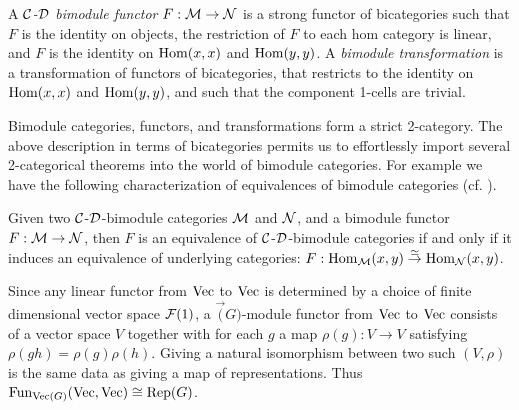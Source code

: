 \documentclass{amsart}
\begin{document}
\begin{definition}		
A {\em $\cC$-$\cD$ bimodule functor} $F:\cM \to \cN$ is a strong functor of bicategories such that 
		 $F$ is the identity on objects,
		  the restriction of $F$ to each hom category is linear,
		 and $F$ is the identity on $\Hom(x,x)$ and $\Hom(y,y)$.
	A {\em bimodule transformation} is a transformation of functors of bicategories, that restricts to the identity on $\Hom(x,x)$ and $\Hom(y,y)$, and such that the component 1-cells are trivial.  
\end{definition} %
	
%
\nid Bimodule categories, functors, and transformations form a strict 2-category.  %
 The above description in terms of bicategories permits us to effortlessly import several 2-categorical theorems into the world of bimodule categories. For example we have the following characterization of equivalences of bimodule categories (cf. \cite{MR2664622}).
 
\begin{lemma} \label{lem:Recog_equiv_of_bimod}
	Given two $\cC$-$\cD$-bimodule categories $\cM$ and $\cN$, and a bimodule functor $F:\cM \to \cN$, then $F$ is an equivalence of $\cC$-$\cD$-bimodule categories if and only if it induces an equivalence of underlying categories: $F: \Hom_{\cM}(x,y) \stackrel{\simeq}{\to} \Hom_{\cN}(x,y)$. 
\end{lemma}

\begin{example}
Since any linear functor from $\Vec$ to $\Vec$ is determined by a choice of finite dimensional vector space $\cF(1)$, a $\Vec(G)$-module functor from $\Vec$ to $\Vec$ consists of a vector space $V$ together with for each $g$ a map $\rho(g): V \rightarrow V$ satisfying $\rho(gh) = \rho(g)\rho(h)$.  Giving a natural isomorphism between two such $(V, \rho)$ is the same data as giving a map of representations.  Thus $\Fun_{\Vec(G)}(\Vec, \Vec) \cong \Rep(G)$.
\end{example}
\end{document}
